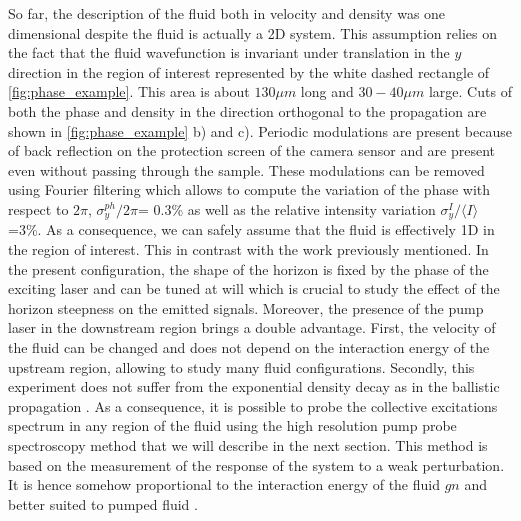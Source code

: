 So far, the description of the fluid both in velocity and density was one dimensional despite the fluid is actually a 2D system. This assumption
relies on the fact that the fluid wavefunction is invariant under translation in the $y$ direction in the  region of interest represented by the white dashed rectangle of \autoref{fig:phase_example}. This area is about $130 \mu m$ long and $30-40 \mu m $ large. 
Cuts of both the phase and density in the direction orthogonal to the propagation are shown in \autoref{fig:phase_example} b) and c). Periodic modulations are present because of back reflection on the protection screen of the camera sensor and are present even without passing through the sample. These modulations can be removed
using Fourier filtering which allows to compute the variation of the phase with respect to $2\pi$,  $\sigma_y^{ph}/2\pi$= 0.3\% as well as the relative intensity variation $\sigma_y^I/\langle I \rangle$ =3\%. As a consequence,
we can safely assume that the fluid is effectively 1D in the region of interest. This in contrast with the work \cite{nguyen_acoustic_2015} previously mentioned. In the present configuration, the shape of the horizon is fixed by the phase of the exciting laser and can be tuned at will which is crucial to
study the effect of the horizon steepness on the emitted signals. Moreover, the presence of the pump laser in the downstream region brings a double advantage. First, the velocity of the fluid can be changed and does not depend on the interaction energy of the upstream region, allowing to study many fluid configurations.
Secondly, this experiment does not suffer from the exponential density decay as in the ballistic propagation \cite{long_range_ballistic_2013}. As a consequence, it is possible to probe the collective excitations spectrum in any region of the fluid using the high resolution pump probe spectroscopy method that we will describe in the next section. This 
 method is based  on the measurement of  the response of the system to a weak perturbation. It is hence somehow proportional to the interaction energy of the fluid $gn$ and better suited to pumped fluid \cite{claude_high-resolution_2022}.

